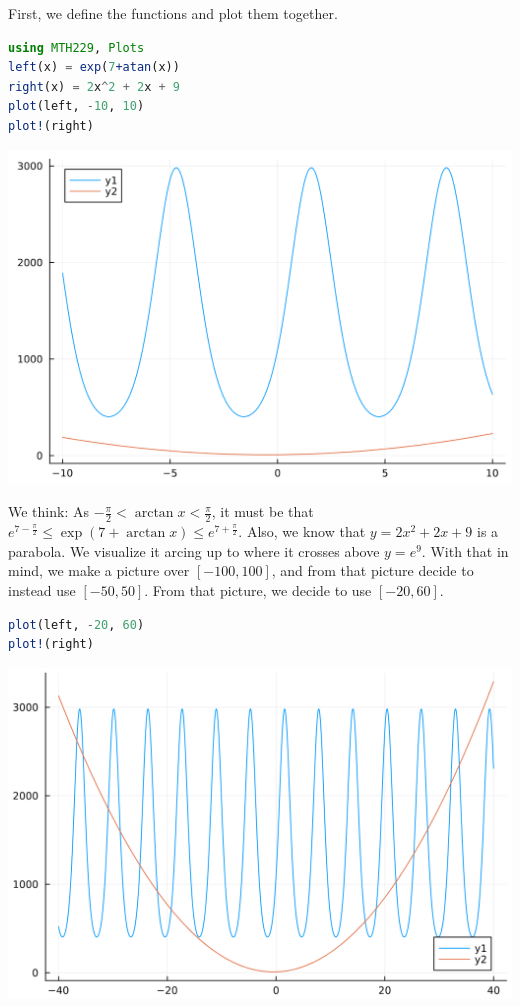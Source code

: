 \documentclass[12pt,answers]{book}
\begin{document}
\vspace{5mm}
First, we define the functions and plot them together.\newline
\begin{minipage}{0.49\textwidth}
\begin{lstlisting}[language=Julia]
using MTH229, Plots
left(x) = exp(7+atan(x))
right(x) = 2x^2 + 2x + 9
plot(left, -10, 10)
plot!(right)
\end{lstlisting}
\end{minipage}
\begin{minipage}{0.49\textwidth}
  \includegraphics[width=0.7\linewidth]{SkeletonNotes/04-graphics-1}
\end{minipage}\newline
We think: As $-\frac{\pi}{2} < \arctan x < \frac{\pi}{2}$, it must be that $e^{7-\frac\pi2} \le \exp(7+\arctan x) \le e^{7+\frac\pi2}$. Also, we know that $y=2x^2+2x+9$ is a parabola. We visualize it arcing up to where it crosses above $y=e^9$. With that in mind, we make a picture over $[-100,100]$, and from that picture decide to instead use $[-50,50]$. From that picture, we decide to use $[-20,60]$.\newline
\begin{minipage}{0.49\textwidth}
\begin{lstlisting}[language=Julia]
plot(left, -20, 60)
plot!(right)
\end{lstlisting}
\end{minipage}
\begin{minipage}{0.49\textwidth}
\includegraphics[width=0.7\linewidth]{SkeletonNotes/04-graphics-2}
\end{minipage}\newline
\end{document}
